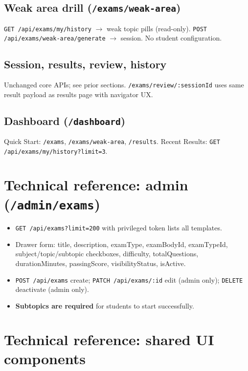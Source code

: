 \documentclass[11pt,a4paper]{article}
\begin{document}
\subsection{Weak area drill (\texttt{/exams/weak-area})}

\texttt{GET /api/exams/my/history} $\rightarrow$ weak topic pills (read-only). \texttt{POST /api/exams/weak-area/generate} $\rightarrow$ session. No student configuration.

\subsection{Session, results, review, history}

Unchanged core APIs; see prior sections. \texttt{/exams/review/:sessionId} uses same result payload as results page with navigator UX.

\subsection{Dashboard (\texttt{/dashboard})}

Quick Start: \texttt{/exams}, \texttt{/exams/weak-area}, \texttt{/results}. Recent Results: \texttt{GET /api/exams/my/history?limit=3}.

\section{Technical reference: admin (\texttt{/admin/exams})}

\begin{itemize}[leftmargin=*]
  \item \texttt{GET /api/exams?limit=200} with privileged token lists all templates.
  \item Drawer form: title, description, examType, examBodyId, examTypeId, subject/topic/subtopic checkboxes, difficulty, totalQuestions, durationMinutes, passingScore, visibilityStatus, isActive.
  \item \texttt{POST /api/exams} create; \texttt{PATCH /api/exams/:id} edit (admin only); \texttt{DELETE} deactivate (admin only).
  \item \textbf{Subtopics are required} for students to start successfully.
\end{itemize}

\section{Technical reference: shared UI components}
\end{document}
